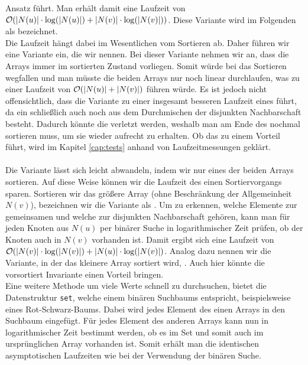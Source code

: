 Ansatz führt. Man erhält damit eine Laufzeit von $\mathcal{O}(|N(u)|\cdot \log (|N(u)|)  + |N(v)|\cdot\log(|N(v)|))$. 
Diese Variante wird im Folgenden als \SorSor{} bezeichnet. 
\\
Die Laufzeit hängt dabei im Wesentlichen vom Sortieren ab. Daher führen wir eine Variante ein, 
die wir  nennen. Bei dieser Variante nehmen wir an, dass
die Arrays immer im sortierten Zustand vorliegen. Somit würde bei \SorSor{} das Sortieren wegfallen
und man müsste die beiden Arrays nur noch linear durchlaufen, was zu einer Laufzeit von $\mathcal{O}(|N(u)| + |N(v)|)$
führen würde. 
Es ist jedoch nicht offensichtlich, dass die Variante zu einer insgesamt besseren Laufzeit eines
 führt, da ein \ct{} schließlich auch noch aus dem Durchmischen der disjunkten Nachbarschaft besteht.
Dadurch könnte die  verletzt werden, weshalb man am Ende des  nochmal sortieren
muss, um sie wieder aufrecht zu erhalten. Ob das  zu einem Vorteil führt, wird im Kapitel 
\ref{cap:tests} anhand von Laufzeitmessungen geklärt.
\\
\\
Die Variante \SorSor{} lässt sich leicht abwandeln, indem wir nur eines der beiden Arrays sortieren.
Auf diese Weise können wir die Laufzeit des einen Sortiervorgangs sparen. Sortieren
wir das größere Array (ohne Beschränkung der Allgemeinheit $N(v)$), bezeichnen wir die Variante als \SorSea{}. Um zu erkennen, 
welche Elemente zur gemeinsamen und welche zur disjunkten Nachbarschaft gehören, kann man für jeden
Knoten aus $N(u)$ per binärer Suche in logarithmischer Zeit prüfen, ob der Knoten auch in $N(v)$ vorhanden ist.
Damit ergibt sich eine Laufzeit von $\mathcal{O}(|N(v)| \cdot \log(|N(v)|) + |N(u)| \cdot \log(|N(v)|)$. Analog dazu
nennen wir die Variante, in der das kleinere Array sortiert wird, \SeaSor. 
Auch hier könnte die vorsortiert Invariante einen Vorteil bringen.
\\
Eine weitere Methode um viele Werte schnell zu durchsuchen, bietet die Datenstruktur \texttt{set}, welche
einem binären Suchbaums entspricht, beispielsweise eines Rot-Schwarz-Baums.
Dabei wird jedes Element des einen Arrays in den Suchbaum eingefügt. 
Für jedes Element des anderen Arrays kann nun in logarithmischer
Zeit bestimmt werden, ob es im Set und somit auch im ursprünglichen Array vorhanden ist.
Somit erhält man die identischen asymptotischen Laufzeiten wie bei der Verwendung der
binären Suche.  
